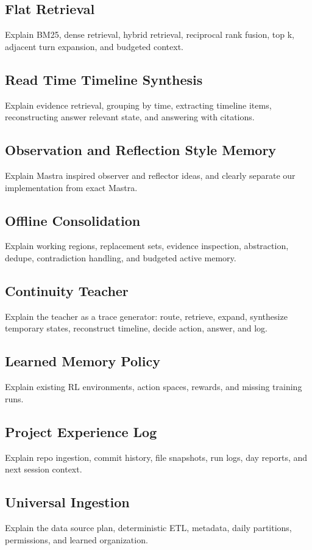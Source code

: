 \documentclass[11pt]{article}
\begin{document}
\subsection{Flat Retrieval}
Explain BM25, dense retrieval, hybrid retrieval, reciprocal rank fusion, top k, adjacent turn expansion, and budgeted context.

\subsection{Read Time Timeline Synthesis}
Explain evidence retrieval, grouping by time, extracting timeline items, reconstructing answer relevant state, and answering with citations.

\subsection{Observation and Reflection Style Memory}
Explain Mastra inspired observer and reflector ideas, and clearly separate our implementation from exact Mastra.

\subsection{Offline Consolidation}
Explain working regions, replacement sets, evidence inspection, abstraction, dedupe, contradiction handling, and budgeted active memory.

\subsection{Continuity Teacher}
Explain the teacher as a trace generator: route, retrieve, expand, synthesize temporary states, reconstruct timeline, decide action, answer, and log.

\subsection{Learned Memory Policy}
Explain existing RL environments, action spaces, rewards, and missing training runs.

\subsection{Project Experience Log}
Explain repo ingestion, commit history, file snapshots, run logs, day reports, and next session context.

\subsection{Universal Ingestion}
Explain the data source plan, deterministic ETL, metadata, daily partitions, permissions, and learned organization.
\end{document}
